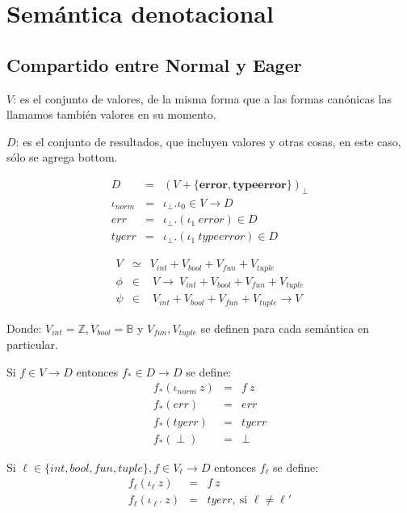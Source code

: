 \documentclass[12pt,a4paper]{article}
\newcommand{\PN}{\par\noindent}
\begin{document}
  \section{Semántica denotacional}
    \subsection{Compartido entre Normal y Eager}
      \PN $V$: es el conjunto de valores, de la misma forma que a las formas canónicas las llamamos también valores en su momento.
      \PN $D$: es el conjunto de resultados, que incluyen valores y otras cosas, en este caso, sólo se agrega bottom.

      \begin{multicols}{2}
        \begin{eqnarray*}
          D &=& (V + \{\textbf{error}, \textbf{typeerror}\})_\bot \\
          \iota_{norm} &=& \iota_{\bot} . \iota_{0} \in V \rightarrow D \\
          err &=& \iota_{\bot} . (\iota_{1} \ error) \in D \\
          tyerr &=& \iota_{\bot} . (\iota_{1} \ typeerror) \in D
        \end{eqnarray*}

        \begin{eqnarray*}
          V &\simeq& V_{int} + V_{bool} + V_{fun} + V_{tuple} \\
          \phi &\in& \ V \rightarrow\ V_{int} + V_{bool} + V_{fun} + V_{tuple} \\
          \psi &\in& \ V_{int} + V_{bool} + V_{fun} + V_{tuple} \rightarrow V
        \end{eqnarray*}
      \end{multicols}

      \PN Donde: $V_{int} = \mathbb{Z}, V_{bool} = \mathbb{B}$ y $V_{fun}, V_{tuple}$ se definen para cada semántica en particular.

      \begin{multicols}{2}
        \PN Si $f\in V\rightarrow D$ entonces $f_{*}\in D\rightarrow D$ se define:
        \begin{eqnarray*}
          f_* (\iota_{norm}\ z) &=& f\ z\\
          f_* (err) &=& err\\
          f_* (tyerr) &=& tyerr\\
          f_* (\perp) &=& \perp
        \end{eqnarray*}
        
        \PN Si $\ell \in \{int, bool, fun, tuple\}, f \in V_{\ell} \rightarrow D$ entonces $f_{\ell}$ se define:
        \begin{eqnarray*}
          f_{\ell} (\iota_{\ell}\ z) &=& f\ z\\
          f_{\ell} (\iota_{\ell'}\ z) &=& tyerr, \ \text{si } \ell \neq \ell'
        \end{eqnarray*}
      \end{multicols}
\end{document}
